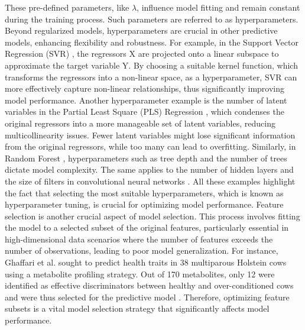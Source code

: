 These pre-defined parameters, like $\lambda$, influence model fitting and remain constant during the training process. Such parameters are referred to as hyperparameters. Beyond regularized models, hyperparameters are crucial in other predictive models, enhancing flexibility and robustness. For example, in the Support Vector Regression (SVR) \citep{drucker_support_1996}, the regressors X are projected onto a linear subspace to approximate the target variable Y. By choosing a suitable kernel function, which transforms the regressors into a non-linear space, as a hyperparameter, SVR can more effectively capture non-linear relationships, thus significantly improving model performance. Another hyperparameter example is the number of latent variables in the Partial Least Square (PLS) Regression \citep{abdi_partial_2003}, which condenses the original regressors into a more manageable set of latent variables, reducing multicollinearity issues. Fewer latent variables might lose significant information from the original regressors, while too many can lead to overfitting. Similarly, in Random Forest \citep{breiman_random_2001}, hyperparameters such as tree depth and the number of trees dictate model complexity. The same applies to the number of hidden layers and the size of filters in convolutional neural networks \citep{lecun_generalization_1989}. All these examples highlight the fact that selecting the most suitable hyperparameters, which is known as hyperparameter tuning, is crucial for optimizing model performance.
Feature selection is another crucial aspect of model selection. This process involves fitting the model to a selected subset of the original features, particularly essential in high-dimensional data scenarios where the number of features exceeds the number of observations, leading to poor model generalization. For instance, Ghaffari et al. sought to predict health traits in 38 multiparous Holstein cows using a metabolite profiling strategy. Out of 170 metabolites, only 12 were identified as effective discriminators between healthy and over-conditioned cows and were thus selected for the predictive model \citep{ghaffari_metabolomics_2019}. Therefore, optimizing feature subsets is a vital model selection strategy that significantly affects model performance.
